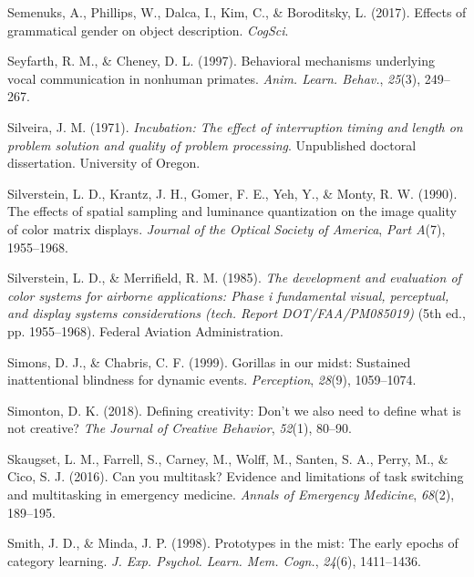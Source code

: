 \documentclass[
]{krantz}
\newlength{\cslhangindent}
\newenvironment{CSLReferences}[2] %
 {\begin{list}{}{%
  \setlength{\itemindent}{0pt}
  \setlength{\leftmargin}{0pt}
  \setlength{\parsep}{0pt}
  \ifodd #1
   \setlength{\leftmargin}{\cslhangindent}
   \setlength{\itemindent}{-1\cslhangindent}
  \fi
  \setlength{\itemsep}{#2\baselineskip}}}
 {\end{list}}
\begin{document}
\begin{CSLReferences}{1}{0}
Semenuks, A., Phillips, W., Dalca, I., Kim, C., \& Boroditsky, L. (2017). Effects of grammatical gender on object description. \emph{CogSci}.

Seyfarth, R. M., \& Cheney, D. L. (1997). Behavioral mechanisms underlying vocal communication in nonhuman primates. \emph{Anim. Learn. Behav.}, \emph{25}(3), 249--267.

Silveira, J. M. (1971). \emph{Incubation: The effect of interruption timing and length on problem solution and quality of problem processing}. Unpublished doctoral dissertation. University of Oregon.

Silverstein, L. D., Krantz, J. H., Gomer, F. E., Yeh, Y., \& Monty, R. W. (1990). The effects of spatial sampling and luminance quantization on the image quality of color matrix displays. \emph{Journal of the Optical Society of America}, \emph{Part A}(7), 1955--1968.

Silverstein, L. D., \& Merrifield, R. M. (1985). \emph{The development and evaluation of color systems for airborne applications: Phase i fundamental visual, perceptual, and display systems considerations (tech. Report DOT/FAA/PM085019)} (5th ed., pp. 1955--1968). Federal Aviation Administration.

Simons, D. J., \& Chabris, C. F. (1999). Gorillas in our midst: Sustained inattentional blindness for dynamic events. \emph{Perception}, \emph{28}(9), 1059--1074.

Simonton, D. K. (2018). Defining creativity: Don't we also need to define what is not creative? \emph{The Journal of Creative Behavior}, \emph{52}(1), 80--90.

Skaugset, L. M., Farrell, S., Carney, M., Wolff, M., Santen, S. A., Perry, M., \& Cico, S. J. (2016). Can you multitask? Evidence and limitations of task switching and multitasking in emergency medicine. \emph{Annals of Emergency Medicine}, \emph{68}(2), 189--195.

Smith, J. D., \& Minda, J. P. (1998). Prototypes in the mist: The early epochs of category learning. \emph{J. Exp. Psychol. Learn. Mem. Cogn.}, \emph{24}(6), 1411--1436.


\end{CSLReferences}
\end{document}
